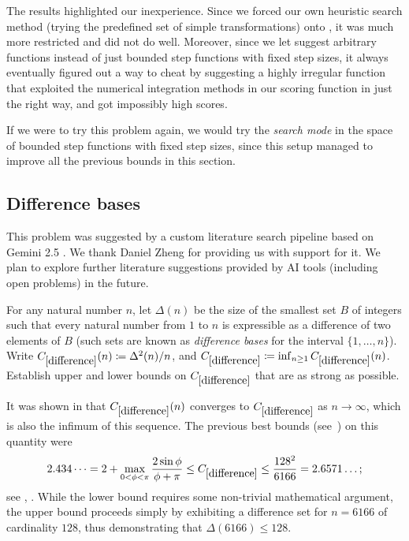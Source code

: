 The results highlighted our inexperience. Since we forced our own heuristic search method (trying the predefined set of simple transformations) onto \AlphaEvolve, it was much more restricted and did not do well. Moreover, since we let \AlphaEvolve suggest arbitrary functions instead of just bounded step functions with fixed step sizes, it always eventually figured out a way to cheat by suggesting a highly irregular function that exploited the numerical integration methods in our scoring function in just the right way, and got impossibly high scores. 

If we were to try this problem again, we would try the \emph{search mode} in the space of bounded step functions with fixed step sizes, since this setup managed to improve all the previous bounds in this section.

\subsection{Difference bases}


This problem was suggested by a custom literature search pipeline based on Gemini 2.5 \cite{comanici2025gemini}. We thank Daniel Zheng for providing us with support for it. We plan to explore further literature  suggestions provided by AI tools (including open problems) in the future.

\renewcommand{\problemURL}{https://google-deepmind.github.io/alphaevolve_repository_of_problems/problems/7.html}

\begin{problem}\label{difference}

For any natural number $n$, let $\Delta(n)$ be the size of the smallest set $B$ of integers such that every natural number from $1$ to $n$ is expressible as a difference of two elements of $B$ (such sets are known as \emph{difference bases} for the interval $\{1,\dots,n\}$).  Write $C_{\ref{difference}}(n) \coloneqq \Delta^2(n)/n$, and $C_{\ref{difference}} \coloneqq \inf_{n \geq 1} C_{\ref{difference}}(n)$.  Establish upper and lower bounds on $C_{\ref{difference}}$ that are as strong as possible.
\end{problem}

It was shown in \cite{redei-renyi} that $C_{\ref{difference}}(n)$ converges to $C_{\ref{difference}}$ as $n \to \infty$, which is also the infimum of this sequence.  The previous best bounds (see~\cite{banakh2019difference}) on this quantity were
$$ 2.434\dots = 2 + \max_{0 < \phi < \pi} \frac{2 \sin \phi}{\phi +\pi} \leq C_{\ref{difference}} \leq \frac{128^2}{6166} = 2.6571\dots;$$
see \cite{leech}, \cite{golay} . While the lower bound requires some non-trivial mathematical argument, the upper bound proceeds simply by exhibiting a difference set for $n=6166$ of cardinality $128$, thus demonstrating that $\Delta(6166) \leq 128$.

